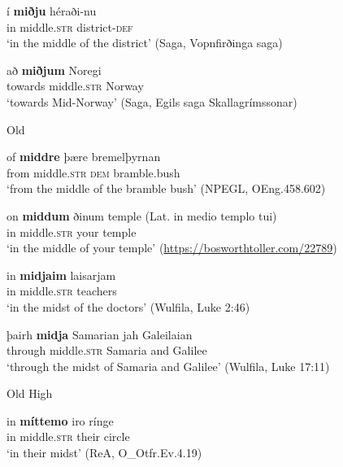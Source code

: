 \documentclass[output=paper,colorlinks,citecolor=brown]{langscibook}
\begin{document}
\begin{exe}
   \ex \label{position6a} 
    \begin{xlist}
      \ex\gll  í \textbf{miðju}  héraði-nu    \\     
       in middle.\textsc{str}   district-\textsc{def} \\ 
       \glt  `in the middle of the district' (Saga, Vopnfirðinga saga) 

     \ex \gll að \textbf{miðjum} Noregi   \\ 
        towards  middle.\textsc{str} Norway \\ 
       \glt  `towards Mid-Norway' (Saga, Egils saga Skallagrímssonar)
    \end{xlist} 

   \ex   Old 
    \begin{xlist}
    \ex \gll of \textbf{middre} þære bremelþyrnan   \\  
        from  middle.\textsc{str} \textsc{dem}  {bramble.bush} \\ 
       \glt  `from the middle of the bramble bush' (NPEGL, OEng.458.602)

      \ex \label{position6d} \gll on \textbf{middum} ðinum temple  \hspace{2mm}(Lat. in medio templo tui) \\
        in middle.\textsc{str} your temple \\ 
       \glt  `in the middle of your temple' (\url{https://bosworthtoller.com/22789})
    \end{xlist} 

   \ex   {}
    \begin{xlist}
      \ex \gll  in \textbf{midj{aim}}  laisarjam    \\ 
         in middle.\textsc{str} teachers  \\ 
       \glt  `in the midst of the doctors' (Wulfila, Luke 2:46)               

     \ex \gll þairh \textbf{midja}  {Samarian jah Galeilaian}  \\ 
        through middle.\textsc{str} {Samaria and Galilee} \\  
        \glt `through the midst of Samaria and Galilee' (Wulfila, Luke 17:11)
    \end{xlist} 

   \ex   Old High  
    \begin{xlist}
    \ex \gll in \textbf{míttemo} iro rínge   \\  
       in middle.\textsc{str} their circle    \\ %
       \glt  `in their midst' (ReA, O\_Otfr.Ev.4.19)


\end{xlist}
\end{exe}
\end{document}

